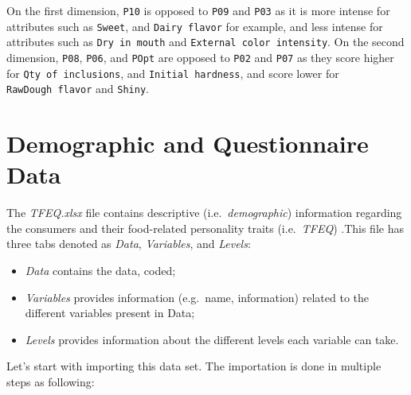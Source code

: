 \documentclass[
]{book}
\providecommand{\tightlist}{%
  \setlength{\itemsep}{0pt}\setlength{\parskip}{0pt}}
\begin{document}
On the first dimension, \texttt{P10} is opposed to \texttt{P09} and \texttt{P03} as it is more intense for attributes such as \texttt{Sweet}, and \texttt{Dairy\ flavor} for example, and less intense for attributes such as \texttt{Dry\ in\ mouth} and \texttt{External\ color\ intensity}. On the second dimension, \texttt{P08}, \texttt{P06}, and \texttt{POpt} are opposed to \texttt{P02} and \texttt{P07} as they score higher for \texttt{Qty\ of\ inclusions}, and \texttt{Initial\ hardness}, and score lower for \texttt{RawDough\ flavor} and \texttt{Shiny}.

\hypertarget{demographic-and-questionnaire-data}{%
\section{Demographic and Questionnaire Data}\label{demographic-and-questionnaire-data}}

The \emph{TFEQ.xlsx} file contains descriptive (i.e.~\emph{demographic}) information regarding the consumers and their food-related personality traits (i.e.~\emph{TFEQ}) .This file has three tabs denoted as \emph{Data}, \emph{Variables}, and \emph{Levels}:

\begin{itemize}
\tightlist
\item
  \emph{Data} contains the data, coded;
\item
  \emph{Variables} provides information (e.g.~name, information) related to the different variables present in Data;
\item
  \emph{Levels} provides information about the different levels each variable can take.
\end{itemize}

Let's start with importing this data set. The importation is done in multiple steps as following:
\end{document}
